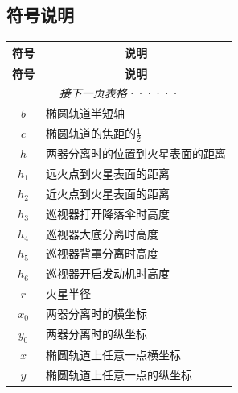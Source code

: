 \documentclass[hyperref,a4paper,UTF8]{ctexart}
\begin{document}
\subsection{符号说明}
\begin{longtable}[h]{|c|p{10cm}|}
    \hline
    \bfseries 符号     & \multicolumn{1}{c|}{\bfseries 说明}                    \\
    \endhead
    \hline
    \bfseries 符号     & \multicolumn{1}{c|}{\bfseries 说明}                    \\
    \endfirsthead
    \multicolumn{2}{c}{\itshape 接下一页表格······}
    \endfoot
    \endlastfoot
    \hline
    $a$                & 椭圆轨道半长轴                                         \\
    \hline
    $b$                & 椭圆轨道半短轴                                         \\
    \hline
    $c$                & 椭圆轨道的焦距的{}$\frac{1}{2}$                        \\
    \hline
    $h$                & 两器分离时的位置到火星表面的距离                       \\
    \hline
    $h_1$              & 远火点到火星表面的距离                                 \\
    \hline
    $h_2$              & 近火点到火星表面的距离                                 \\
    \hline
    $h_3$              & 巡视器打开降落伞时高度                                 \\
    \hline
    $h_4$              & 巡视器大底分离时高度                                   \\
    \hline
    $h_5$              & 巡视器背罩分离时高度                                   \\
    \hline
    $h_6$              & 巡视器开启发动机时高度                                 \\
    \hline
    $r$                & 火星半径                                               \\
    \hline
    $x_0$              & 两器分离时的横坐标                                     \\
    \hline
    $y_0$              & 两器分离时的纵坐标                                     \\
    \hline
    $x$                & 椭圆轨道上任意一点横坐标                               \\
    \hline
    $y$                & 椭圆轨道上任意一点的纵坐标                             \\

\end{longtable}
\end{document}
